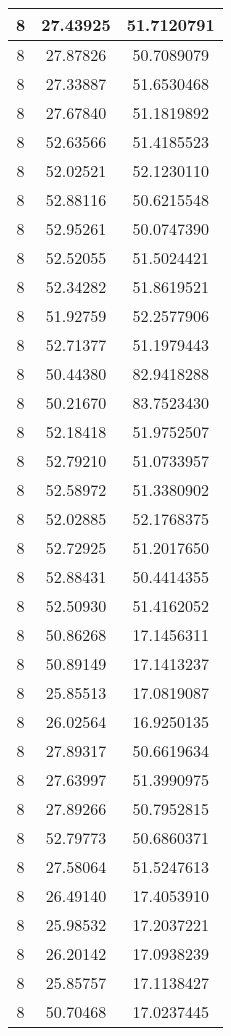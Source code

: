 \documentclass[
]{book}
\begin{document}
\begin{tabular}{c|c|c}
\hline
8 & 27.43925 & 51.7120791\\
\hline
8 & 27.87826 & 50.7089079\\
\hline
8 & 27.33887 & 51.6530468\\
\hline
8 & 27.67840 & 51.1819892\\
\hline
8 & 52.63566 & 51.4185523\\
\hline
8 & 52.02521 & 52.1230110\\
\hline
8 & 52.88116 & 50.6215548\\
\hline
8 & 52.95261 & 50.0747390\\
\hline
8 & 52.52055 & 51.5024421\\
\hline
8 & 52.34282 & 51.8619521\\
\hline
8 & 51.92759 & 52.2577906\\
\hline
8 & 52.71377 & 51.1979443\\
\hline
8 & 50.44380 & 82.9418288\\
\hline
8 & 50.21670 & 83.7523430\\
\hline
8 & 52.18418 & 51.9752507\\
\hline
8 & 52.79210 & 51.0733957\\
\hline
8 & 52.58972 & 51.3380902\\
\hline
8 & 52.02885 & 52.1768375\\
\hline
8 & 52.72925 & 51.2017650\\
\hline
8 & 52.88431 & 50.4414355\\
\hline
8 & 52.50930 & 51.4162052\\
\hline
8 & 50.86268 & 17.1456311\\
\hline
8 & 50.89149 & 17.1413237\\
\hline
8 & 25.85513 & 17.0819087\\
\hline
8 & 26.02564 & 16.9250135\\
\hline
8 & 27.89317 & 50.6619634\\
\hline
8 & 27.63997 & 51.3990975\\
\hline
8 & 27.89266 & 50.7952815\\
\hline
8 & 52.79773 & 50.6860371\\
\hline
8 & 27.58064 & 51.5247613\\
\hline
8 & 26.49140 & 17.4053910\\
\hline
8 & 25.98532 & 17.2037221\\
\hline
8 & 26.20142 & 17.0938239\\
\hline
8 & 25.85757 & 17.1138427\\
\hline
8 & 50.70468 & 17.0237445\\

\end{tabular}
\end{document}
